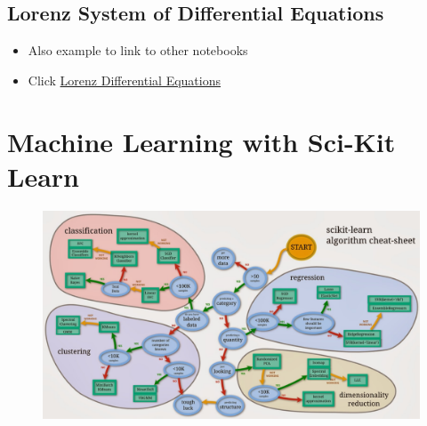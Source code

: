 \documentclass{article}
\begin{document}
    \subsection{Lorenz System of Differential Equations}

\begin{itemize}
\itemsep1pt\parskip0pt
\item
  Also example to link to other notebooks
\item
  Click \href{static/notebook/LDE.ipynb}{Lorenz Differential Equations}
\end{itemize}

    \section{Machine Learning with Sci-Kit Learn}

\begin{figure}[htbp]
\centering
\includegraphics{static/img/scikit.jpg}
\end{figure}
\end{document}
